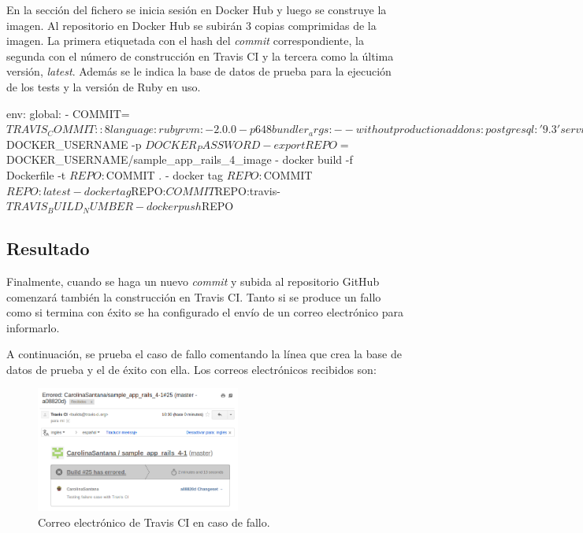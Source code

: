 En la sección  del fichero se inicia sesión en Docker Hub y luego se construye la imagen. Al repositorio en Docker Hub se subirán 3 copias comprimidas de la imagen. La primera etiquetada con el hash del \textit{commit} correspondiente, la segunda con el número de construcción en Travis CI y la tercera como la última versión, \textit{latest}. Además se le indica la base de datos de prueba para la ejecución de los tests y la versión de Ruby en uso.

\begin{codelisting}
\label{code:travis}
\begin{code}
env:
  global:
  - COMMIT=${TRAVIS_COMMIT::8}
language: ruby
rvm:
- 2.0.0-p648
bundler_args: --without production
addons:
  postgresql: '9.3'
services:
- docker
before_script:
- cp config/database.yml.travis config/database.yml
- psql -c 'create database travis_ci_test;' -U postgres
- RAILS_ENV=test bundle exec rake db:migrate --trace
script:
- bundle exec rspec
notifications:
  email:
    recipients:
    - c.santanamartel@gmail.com
    on_success: always
    on_failure: always
sudo: required
after_success:
- docker login -u $DOCKER_USERNAME -p $DOCKER_PASSWORD
- export REPO=$DOCKER_USERNAME/sample_app_rails_4_image
- docker build -f Dockerfile -t $REPO:$COMMIT .
- docker tag $REPO:$COMMIT $REPO:latest
- docker tag $REPO:$COMMIT $REPO:travis-$TRAVIS_BUILD_NUMBER
- docker push $REPO  
\end{code}
\end{codelisting}

\subsection{Resultado}

Finalmente, cuando se haga un nuevo \textit{commit} y subida al repositorio GitHub comenzará también la construcción en Travis CI. Tanto si se produce un fallo como si termina con éxito se ha configurado el envío de un correo electrónico para informarlo. 

A continuación, se prueba el caso de fallo comentando la línea que crea la base de datos de prueba  y el de éxito con ella. Los correos electrónicos recibidos son:

\begin{figure}[H]
\centering
\includegraphics[width=0.6\textwidth]{images/figures/travisfailure.png}
\caption{Correo electrónico de Travis CI en caso de fallo.}
\end{figure}

